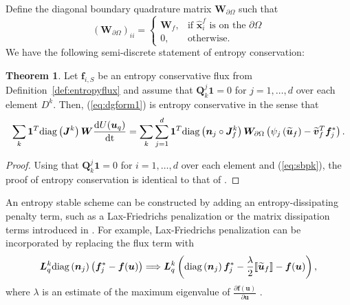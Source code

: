 \documentclass[preprint,10pt]{article}
\theoremstyle{definition}
\theoremstyle{lemma}
\theoremstyle{theorem}
\newtheorem{theorem}{Theorem}
\theoremstyle{assumption}
\renewcommand{\hat}{\widehat}
\renewcommand{\tilde}{\widetilde}
\newcommand{\td}[2]{\frac{{\rm d}#1}{{\rm d}{\rm #2}}}
\newcommand{\pd}[2]{\frac{\partial#1}{\partial#2}}
\newcommand{\LRp}[1]{\left( #1 \right)}
\newcommand{\LRs}[1]{\left[ #1 \right]}
\newcommand{\jump}[1] {\ensuremath{\llbracket#1\rrbracket}}
\newcommand{\note}[1]{{\color{blue}{#1}}}
\newcommand{\diag}[1]{{\rm diag}\LRp{#1}}
\begin{document}
{Define the diagonal boundary quadrature matrix $\bm{W}_{\partial \Omega}$ such that
\[
\LRp{\bm{W}_{\partial \Omega} }_{ii} = \begin{cases}
  \bm{W}_f, & \text{if $\hat{\bm{x}}^f_i$ is on the $\partial \Omega$}\\
0, & \text{otherwise}. 
\end{cases}
\]
We have the following semi-discrete statement of entropy conservation:
\begin{theorem}
  Let $\bm{f}_{i,S}$ be an entropy conservative flux from Definition~\ref{def:entropyflux} and assume that $\bm{Q}^j_k\bm{1} = 0$ for $j = 1,\ldots,d$ over each element $D^k$.  Then, (\ref{eq:dgform1}) is entropy conservative in the sense that
\[
  \sum_k \bm{1}^T\diag{\bm{J}^k}\bm{W}\td{U(\bm{u}_q)}{t} = \sum_k \sum_{j=1}^d \bm{1}^T\diag{\bm{n}_j\circ\bm{J}^k_f}\bm{W}_{\partial \Omega} \LRp{\psi_j\LRp{\tilde{\bm{u}}_f}-\tilde{\bm{v}}_f^T\bm{f}_j^*}.
\]
\label{thm:stab1}
\end{theorem}
\begin{proof}
Using that $\bm{Q}^j_k\bm{1} = 0$ for $i = 1,\ldots,d$ over each element and (\ref{eq:sbpk}), the proof of entropy conservation is identical to that of \cite{chan2017discretely}.  
\end{proof}
An entropy stable scheme can be constructed by adding an entropy-dissipating penalty term, such as a Lax-Friedrichs penalization or the matrix dissipation terms introduced in \cite{chandrashekar2013kinetic, winters2017uniquely}.  For example, Lax-Friedrichs penalization can be incorporated by replacing the flux term with
\[
\bm{L}^k_q \diag{\bm{n}_j} \LRp{\bm{f}_j^*-\bm{f}(\bm{u})} \Longrightarrow \bm{L}^k_q\LRp{\diag{\bm{n}_j} \bm{f}_j^* - \frac{\lambda}{2}\jump{\tilde{\bm{u}}_f}- \bm{f}(\bm{u})},
\]
where $\lambda$ is an estimate of the maximum eigenvalue of $\pd{\bm{f}(\bm{u})}{\bm{u}}$ \cite{chen2017entropy, chan2017discretely}.

}
\end{document}
